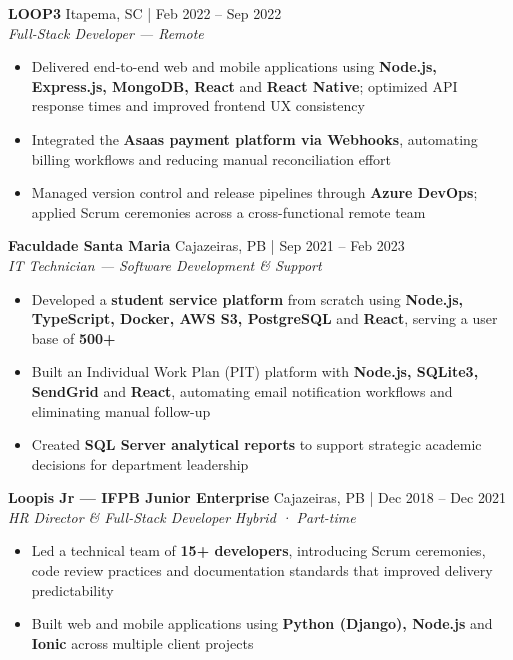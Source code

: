 \documentclass[a4paper]{article}
\begin{document}
\textbf{LOOP3} \hfill Itapema, SC | Feb 2022 -- Sep 2022\\
\textit{Full-Stack Developer — Remote}\\
\vspace{-3mm}
\begin{itemize}[leftmargin=*, itemsep=-3pt]
    \item Delivered end-to-end web and mobile applications using \textbf{Node.js, Express.js, MongoDB, React} and \textbf{React Native}; optimized API response times and improved frontend UX consistency
    \item Integrated the \textbf{Asaas payment platform via Webhooks}, automating billing workflows and reducing manual reconciliation effort
    \item Managed version control and release pipelines through \textbf{Azure DevOps}; applied Scrum ceremonies across a cross-functional remote team
\end{itemize}

\vspace{2mm}

\textbf{Faculdade Santa Maria} \hfill Cajazeiras, PB | Sep 2021 -- Feb 2023\\
\textit{IT Technician — Software Development \& Support}\\
\vspace{-3mm}
\begin{itemize}[leftmargin=*, itemsep=-3pt]
    \item Developed a \textbf{student service platform} from scratch using \textbf{Node.js, TypeScript, Docker, AWS S3, PostgreSQL} and \textbf{React}, serving a user base of \textbf{500+}
    \item Built an Individual Work Plan (PIT) platform with \textbf{Node.js, SQLite3, SendGrid} and \textbf{React}, automating email notification workflows and eliminating manual follow-up
    \item Created \textbf{SQL Server analytical reports} to support strategic academic decisions for department leadership
\end{itemize}

\vspace{2mm}

\textbf{Loopis Jr — IFPB Junior Enterprise} \hfill Cajazeiras, PB | Dec 2018 -- Dec 2021\\
\textit{HR Director \& Full-Stack Developer} \hfill \textit{Hybrid · Part-time}\\
\vspace{-3mm}
\begin{itemize}[leftmargin=*, itemsep=-3pt]
    \item Led a technical team of \textbf{15+ developers}, introducing Scrum ceremonies, code review practices and documentation standards that improved delivery predictability
    \item Built web and mobile applications using \textbf{Python (Django), Node.js} and \textbf{Ionic} across multiple client projects
\end{itemize}
\end{document}

